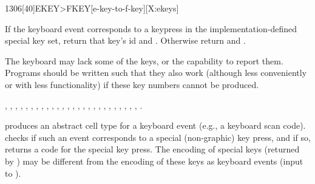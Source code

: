 \pagebreak
\begin{worddef}[EKEYtoFKEY]{1306}[40]{EKEY>FKEY}[e-key-to-f-key][X:ekeys]
\item {}

	If the keyboard event  corresponds to a keypress in the
	implementation-defined special key set, return that key's id
	 and . Otherwise return  and
	.

\note
	The keyboard may lack some of the keys, or the capability to report
	them. Programs should be written such that they also work (although
	less conveniently or with less functionality) if these key numbers
	cannot be produced.

\see
	,
	,
	, \linebreak
	,
	,
	, \linebreak
	,
	,
	, \linebreak
	,
	,
	, \linebreak
	,
	,
	, \linebreak
	,
	,
	, \linebreak
	,
	,
	, \linebreak
	,
	,
	, \linebreak
	,
	, \linebreak
	.


	\begin{rationale} %


		 produces an abstract cell type for a keyboard
		event (e.g., a keyboard scan code).   checks
		if such an event corresponds to a special (non-graphic) key
		press, and if so, returns a code for the special key press.
		The encoding of special keys (returned by )
		may be different from the encoding of these keys as keyboard
		events (input to ).


\end{rationale}
\end{worddef}
